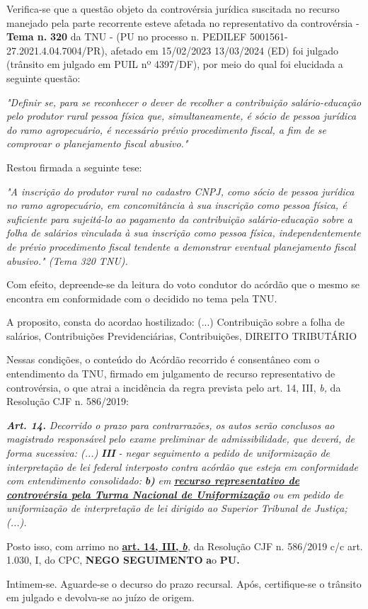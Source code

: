 \documentclass[12pt]{article}
\begin{document}
\justifying
\noindent Verifica-se que a questão objeto da controvérsia jurídica suscitada no recurso manejado pela parte recorrente esteve afetada no representativo da controvérsia - \textbf{Tema n. }\textbf{320} da TNU - (PU no processo n. PEDILEF 5001561-27.2021.4.04.7004/PR),  afetado em 15/02/2023 13/03/2024 (ED) foi julgado (trânsito em julgado em PUIL nº 4397/DF), por meio do qual foi elucidada a seguinte questão:

\noindent \textit{"Definir se, para se reconhecer o dever de recolher a contribuição salário-educação pelo produtor rural pessoa física que, simultaneamente, é sócio de pessoa jurídica do ramo agropecuário, é necessário prévio procedimento fiscal, a fim de se comprovar o planejamento fiscal abusivo."}

\noindent Restou firmada a seguinte tese:

\noindent \textit{"A inscrição do produtor rural no cadastro CNPJ, como sócio de pessoa jurídica no ramo agropecuário, em concomitância à sua inscrição como pessoa física, é suficiente para sujeitá-lo ao pagamento da contribuição salário-educação sobre a folha de salários vinculada à sua inscrição como pessoa física, independentemente de prévio procedimento fiscal tendente a demonstrar eventual planejamento fiscal abusivo." (Tema 320 TNU).}

\noindent Com efeito, depreende-se da leitura do voto condutor do acórdão que o mesmo se encontra em conformidade com o decidido no  tema pela TNU.

\noindent A proposito, consta do acordao hostilizado: (...) Contribuição sobre a folha de salários, Contribuições Previdenciárias, Contribuições, DIREITO TRIBUTÁRIO

\noindent Nessas condições, o conteúdo do Acórdão recorrido é consentâneo com o entendimento da TNU, firmado em julgamento de recurso representativo de controvérsia, o que atrai a incidência da regra prevista pelo art. 14, III, \textit{b,} da Resolução CJF n. 586/2019:

\noindent \textit{\textbf{Art. 14.}}\textit{ Decorrido o prazo para contrarrazões, os autos serão conclusos ao magistrado responsável pelo exame preliminar de admissibilidade, que deverá, de forma sucessiva: (...) }\textit{\textbf{III }}\textit{- negar seguimento a pedido de uniformização de interpretação de lei federal interposto contra acórdão que esteja em conformidade com entendimento consolidado: }\textit{\textbf{b)}}\textit{ em }\uline{\textit{\textbf{recurso representativo de controvérsia pela Turma Nacional de Uniformização}}}\textit{ ou em pedido de uniformização de interpretação de lei dirigido ao Superior Tribunal de Justiça;(...).}

\noindent Posto isso, com arrimo no \uline{\textbf{art. 14, III, }}\uline{\textit{\textbf{b}}}\textit{,} da Resolução CJF n. 586/2019 c/c art. 1.030, I, do CPC, \textbf{NEGO SEGUIMENTO }\textbf{a}o\textbf{ PU}\textbf{.}

\noindent Intimem-se. Aguarde-se o decurso do prazo recursal. Após, certifique-se o trânsito em julgado e devolva-se ao juízo de origem.
\end{document}
